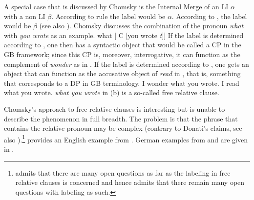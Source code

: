 A special case that is discussed by Chomsky is the Internal Merge of an LI
$\alpha$ with a non LI  $\beta$. According to rule  the label would be $\alpha$. According
to , the label would be $\beta$ (see also ). Chomsky discusses the combination of the
pronoun \emph{what} with \emph{you wrote} as an example.
\ea
\label{ex-what-you-wrote}
what [ C [you wrote \emph{t}]]
\z
If the label is determined according to , one then has a syntactic object that would be
called a CP in the GB framework; since this CP is, moreover, interrogative, it can function as the
complement of \emph{wonder} as in . If the label is determined according to , one gets an
object that can function as the accusative object of \emph{read} in , that is, something
that corresponds to a DP in GB terminology.
\eal
\ex I wonder what you wrote.
\ex\label{ex-i-read-what-you-wrote} I read what you wrote.
\zl
\emph{what you wrote} in (b) is a so-called free relative clause.



\addlines[1]
Chomsky's approach to free relative clauses is interesting but is unable to describe the phenomenon in
full breadth. The problem is that the phrase that contains the relative pronoun may be
complex (contrary to Donati's claims, see also ).\footnote{%
\citet[]{Chomsky2013a} admits that there are many open questions as far as the labeling in free relative
clauses is concerned and hence admits that there remain many open questions with labeling as such.
}  provides an English example from \citet[]{BG78}. German
examples from  and  are given in .

